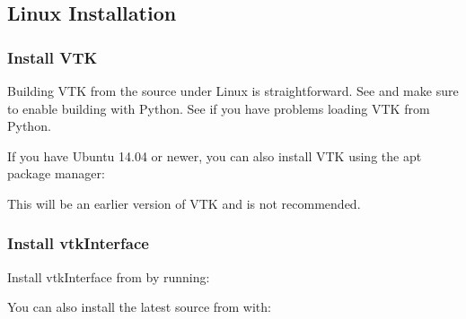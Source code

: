 \documentclass[letterpaper,10pt,english]{sphinxmanual}
\begin{document}
\subsection{Linux Installation}
\label{\detokenize{installation:linux-installation}}

\subsubsection{Install VTK}
\label{\detokenize{installation:id2}}
Building VTK from the source under Linux is straightforward.  See  and make sure to enable building with Python.  See  if you have problems loading VTK from Python.

If you have Ubuntu 14.04 or newer, you can also install VTK using the apt
package manager:

\begin{sphinxVerbatim}[commandchars=\\\{\}]
   
\end{sphinxVerbatim}

This will be an earlier version of VTK and is not recommended.


\subsubsection{Install vtkInterface}
\label{\detokenize{installation:id3}}
Install vtkInterface from  by running:

\begin{sphinxVerbatim}[commandchars=\\\{\}]
  
\end{sphinxVerbatim}

You can also install the latest source from
 with:

\begin{sphinxVerbatim}[commandchars=\\\{\}]
  
 
  
\end{sphinxVerbatim}
\end{document}
